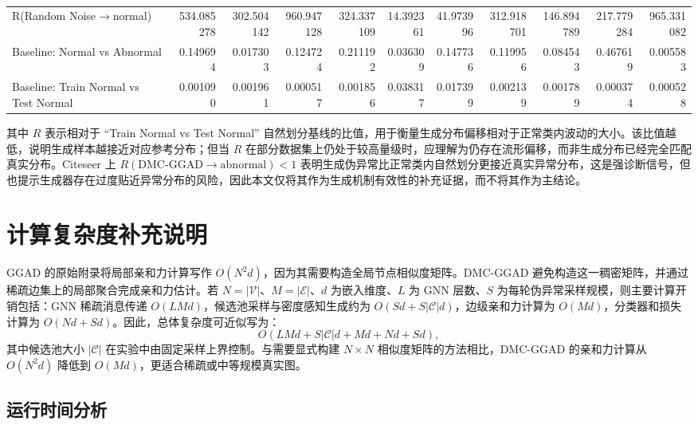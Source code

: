 ﻿﻿﻿﻿    \documentclass[conference, onecolumn]{IEEEtran}
\begin{document}
\begin{table}[htbp]
{\begin{tabular}{l|rrrrrrrrrr}
    R(Random Noise$\rightarrow$normal) & 534.085278 & 302.504142 & 960.947128 & 324.337109 & 14.392361 & 41.973996 & 312.918701 & 146.894789 & 217.779284 & 965.331082 \\
    Baseline: Normal vs Abnormal & 0.149694 & 0.017303 & 0.124724 & 0.211192 & 0.036309 & 0.147736 & 0.119956 & 0.084543 & 0.467619 & 0.005583 \\
    Baseline: Train Normal vs Test Normal & 0.001090 & 0.001961 & 0.000517 & 0.001856 & 0.038317 & 0.017399 & 0.002139 & 0.001789 & 0.000374 & 0.000528 \\
    \hline
    \end{tabular}
    }
    \end{table}

    其中 $R$ 表示相对于 ``Train Normal vs Test Normal'' 自然划分基线的比值，用于衡量生成分布偏移相对于正常类内波动的大小。该比值越低，说明生成样本越接近对应参考分布；但当 $R$ 在部分数据集上仍处于较高量级时，应理解为仍存在流形偏移，而非生成分布已经完全匹配真实分布。Citeseer 上 $R(\mathrm{DMC\mbox{-}GGAD}\rightarrow\mathrm{abnormal})<1$ 表明生成伪异常比正常类内自然划分更接近真实异常分布，这是强诊断信号，但也提示生成器存在过度贴近异常分布的风险，因此本文仅将其作为生成机制有效性的补充证据，而不将其作为主结论。

    \FloatBarrier
    \section{计算复杂度补充说明}
    \label{app:complexity}

    GGAD 的原始附录将局部亲和力计算写作 $O(N^2d)$，因为其需要构造全局节点相似度矩阵。DMC-GGAD 避免构造这一稠密矩阵，并通过稀疏边集上的局部聚合完成亲和力估计。若 $N=|\mathcal{V}|$、$M=|\mathcal{E}|$、$d$ 为嵌入维度、$L$ 为 GNN 层数、$S$ 为每轮伪异常采样规模，则主要计算开销包括：GNN 稀疏消息传递 $O(LMd)$，候选池采样与密度感知生成约为 $O(Sd + S|\mathcal{C}|d)$，边级亲和力计算为 $O(Md)$，分类器和损失计算为 $O(Nd + Sd)$。因此，总体复杂度可近似写为：
    \begin{equation}
        O(LMd + S|\mathcal{C}|d + Md + Nd + Sd),
    \end{equation}
    其中候选池大小 $|\mathcal{C}|$ 在实验中由固定采样上界控制。与需要显式构建 $N \times N$ 相似度矩阵的方法相比，DMC-GGAD 的亲和力计算从 $O(N^2d)$ 降低到 $O(Md)$，更适合稀疏或中等规模真实图。

    \subsection{运行时间分析}
\end{document}
